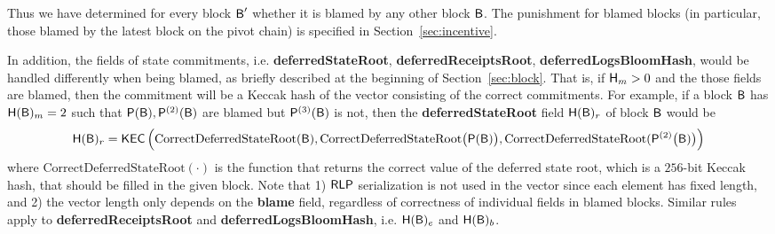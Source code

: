 	Thus we have determined for every block $\textsf{B}'$ whether it is blamed by any other block $\textsf{B}$.
	The punishment for blamed blocks (in particular, those blamed by the latest block on the pivot chain) is specified in Section~\ref{sec:incentive}.

	In addition, the fields of state commitments, i.e. {\bf deferredStateRoot}, {\bf deferredReceiptsRoot}, {\bf deferredLogsBloomHash}, 
	would be handled differently when being blamed, as briefly described at the beginning of Section~\ref{sec:block}.
	That is, if $\textsf{H}_m>0$ and the those fields are blamed, 
	then the commitment will be a Keccak hash of the vector consisting of the correct commitments.
	For example, if a block $\textsf{B}$ has $\textsf{H}(\textsf{B})_m=2$ such that $\mathsf{P}(\textsf{B}),\mathsf{P}^{(2)}(\textsf{B})$ are blamed but $\mathsf{P}^{(3)}(\textsf{B})$ is not, then the {\bf deferredStateRoot} field 
	$\textsf{H}(\textsf{B})_r$ of block $\textsf{B}$
	would be 
	\begin{align}
		\textsf{H}(\textsf{B})_r = \mathsf{KEC}\left( \mathrm{CorrectDeferredStateRoot}(\textsf{B}), \mathrm{CorrectDeferredStateRoot}\big(\mathsf{P}(\textsf{B})\big), \mathrm{CorrectDeferredStateRoot}(\mathsf{P}^{(2)}\big(\textsf{B})\big) \right)
	\end{align}
	where $\mathrm{CorrectDeferredStateRoot}(\cdot)$ is the function that returns the correct value of the deferred state root, 
	which is a $256$-bit Keccak hash, that should be filled in the given block.
	Note that 1) $\mathsf{RLP}$ serialization is not used in the vector since each element has fixed length,
	and 2) the vector length only depends on the {\bf blame} field, regardless of correctness of individual fields in  blamed blocks.
	Similar rules apply to  {\bf deferredReceiptsRoot} and {\bf deferredLogsBloomHash}, i.e. $\textsf{H}(\textsf{B})_e$ and $\textsf{H}(\textsf{B})_b$.

